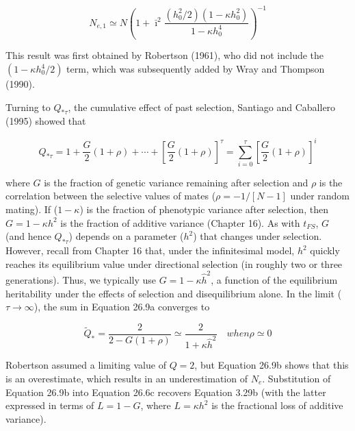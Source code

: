 \documentclass{article}
\begin{document}
\begin{equation}
N_{e,1}\simeq N\left(1+\bar{\imath}^{2}\frac{(h_{0}^{2}/2)(1-\kappa h_{0}^{2})}{1-\kappa h_{0}^{4}}\right)^{-1}
\tag{26.8}
\label{eq:26_8}
\end{equation}

This result was first obtained by Robertson (1961), who did not include the  $ (1-\kappa h_0^4/2) $ term, which was subsequently added by Wray and Thompson (1990).

Turning to  $ Q_{*\tau} $, the cumulative effect of past selection, Santiago and Caballero (1995) showed that

\begin{equation}
Q_{*\tau}=1+\frac{G}{2}(1+\rho)+\cdots+\left[\frac{G}{2}(1+\rho)\right]^{\tau}=\sum_{i=0}^{\tau}\left[\frac{G}{2}(1+\rho)\right]^{i}
\tag{26.9a}
\label{eq:26_9a}
\end{equation}

where $G$ is the fraction of genetic variance remaining after selection and $\rho$ is the correlation between the selective values of mates ($\rho = -1/[N - 1]$ under random mating). If ($1 - \kappa$) is the fraction of phenotypic variance after selection, then $G = 1 - \kappa h^2$ is the fraction of additive variance (Chapter 16). As with $t_{FS}$, $G$ (and hence $Q_{*\tau}$) depends on a parameter ($h^2$) that changes under selection. However, recall from Chapter 16 that, under the infinitesimal model, $h^2$ quickly reaches its equilibrium value under directional selection (in roughly two or three generations). Thus, we typically use $G = 1 - \kappa \widehat{h}^2$, a function of the equilibrium heritability under the effects of selection and disequilibrium alone. In the limit ($\tau \to \infty$), the sum in Equation 26.9a converges to

\begin{equation}
\widetilde{Q}_{*}=\frac{2}{2-G(1+\rho)}\simeq\frac{2}{1+\kappa\widehat{h}^{2}}\quad when\rho\simeq0
\tag{26.9b}
\label{eq:26_9b}
\end{equation}

Robertson assumed a limiting value of $Q = 2$, but Equation 26.9b shows that this is an overestimate, which results in an underestimation of $N_e$. Substitution of Equation 26.9b into Equation 26.6c recovers Equation 3.29b (with the latter expressed in terms of $L = 1 - G$, where $L = \kappa h^2$ is the fractional loss of additive variance).
\end{document}
